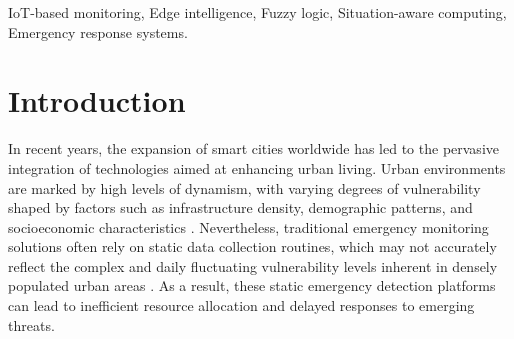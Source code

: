 \documentclass[conference]{IEEEtran}
\begin{document}
\begin{IEEEkeywords}
IoT-based monitoring, Edge intelligence, Fuzzy logic, Situation-aware computing, Emergency response systems.
\end{IEEEkeywords}

\section{Introduction}
%

In recent years, the expansion of smart cities worldwide has led to the pervasive integration of technologies aimed at enhancing urban living. Urban environments are marked by high levels of dynamism, with varying degrees of vulnerability shaped by factors such as infrastructure density, demographic patterns, and socioeconomic characteristics \cite{fischerSusceptibilityVulnerabilityAveraged2016}. Nevertheless, traditional emergency monitoring solutions often rely on static data collection routines, which may not accurately reflect the complex and daily fluctuating vulnerability levels inherent in densely populated urban areas \cite{bittencourtSurveyAdaptiveSmart2024}. As a result, these static emergency detection platforms can lead to inefficient resource allocation and delayed responses to emerging threats. 
\end{document}
